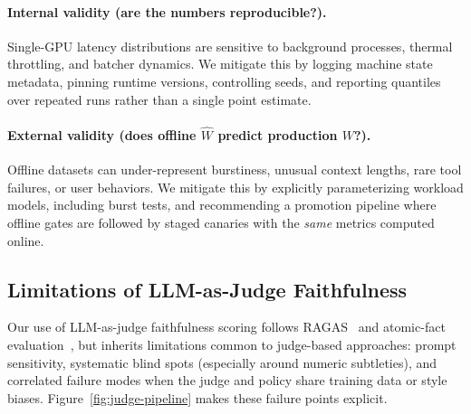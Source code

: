 \documentclass[11pt]{article}
\begin{document}
\paragraph{Internal validity (are the numbers reproducible?).}
Single-GPU latency distributions are sensitive to background processes, thermal throttling, and batcher dynamics.
We mitigate this by logging machine state metadata, pinning runtime versions, controlling seeds, and reporting quantiles over repeated runs rather than a single point estimate.

\paragraph{External validity (does offline $\widehat{W}$ predict production $W$?).}
Offline datasets can under-represent burstiness, unusual context lengths, rare tool failures, or user behaviors.
We mitigate this by explicitly parameterizing workload models, including burst tests, and recommending a promotion pipeline where offline gates are followed by staged canaries with the \emph{same} metrics computed online.

\subsection{Limitations of LLM-as-Judge Faithfulness}
\label{sec:discussion-judge}

Our use of LLM-as-judge faithfulness scoring follows RAGAS~\citep{es2023ragas} and atomic-fact evaluation~\citep{atomicFacts2024}, but inherits limitations common to judge-based approaches: prompt sensitivity, systematic blind spots (especially around numeric subtleties), and correlated failure modes when the judge and policy share training data or style biases.
Figure~\ref{fig:judge-pipeline} makes these failure points explicit.
\end{document}

